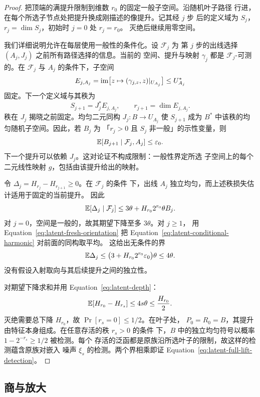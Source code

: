 \begin{proof}
把顶端的满提升限制到维数 $r_0$ 的固定一般子空间。沿随机叶子路径
行进，在每个所选子节点处把提升换成刚描述的像提升。记其经 $j$ 步
后的定义域为 $S_j$，$r_j=\dim S_j$，初始时 $j=0$ 处 $r_j=r_0$。
灭绝后继续用零空间。

我们详细说明允许在每层使用一般性的条件化。设 $\mathcal F_j$ 为
第 $j$ 步的出线选择 $(A_j,J_j)$ 之前所有路径选择的信息。当前的
空间、提升与映射 $\gamma_j$ 都是 $\mathcal F_j$-可测的。在
$\mathcal F_j$ 与 $A_j$ 的条件下，子空间
\[
 E_{j,A_j}
 =\operatorname{im}\bigl[z\mapsto(\gamma_{j,z},z)|_{U_{A_j}}\bigr]
 \le U_{A_j}^*
\]
固定。下一个定义域与其秩为
\[
 S_{j+1}=J_j^*E_{j,A_j},
 \qquad r_{j+1}=\dim E_{j,A_j}.
\]
秩在 $J_j$ 揭晓之前固定。均匀二元同构 $J_j:B\to U_{A_j}$ 使
$S_{j+1}$ 成为 $B^*$ 中该秩的均匀随机子空间。因此，若 $B_j$ 为
「$r_j>0$ 且 $S_j$ 非一般」的示性变量，则
\begin{equation}\label{eq:latent-fresh-orientation}
 \mathbb E[B_{j+1}\mid\mathcal F_j,A_j]\le\varepsilon_0.
\end{equation}
下一个提升可以依赖 $J_j$。这对论证不构成限制：一般性界定所选
子空间上的每个二元线性映射 $g$，包括由该提升给出的映射。

令 $\Delta_j=H_{r_j}-H_{r_{j+1}}\ge0$。在 $\mathcal F_j$ 的条件
下，出线 $A_j$ 独立均匀，而上述秩损失估计适用于固定的当前提升。
因此
\begin{equation}\label{eq:latent-conditional-harmonic}
 \mathbb E[\Delta_j\mid\mathcal F_j]
 \le3\theta+H_{r_0}2^{r_0}\theta B_j.
\end{equation}
对 $j=0$，空间是一般的，故其期望下降至多 $3\theta$。对 $j\ge1$，
用 Equation~\eqref{eq:latent-fresh-orientation} 把
Equation~\eqref{eq:latent-conditional-harmonic} 对前面的同构取平均。
这给出无条件的界
\[
 \mathbb E\Delta_j
 \le\bigl(3+H_{r_0}2^{r_0}\varepsilon_0\bigr)\theta
 \le4\theta.
\]
没有假设入射取向与其后续提升之间的独立性。

对期望下降求和并用 Equation~\eqref{eq:latent-depth}：
\[
 \mathbb E[H_{r_0}-H_{r_s}]\le4s\theta\le\frac{H_{r_0}}2.
\]
灭绝需要总下降 $H_{r_0}$，故 $\Pr[r_s=0]\le1/2$。在叶子处，
$P_0=R_0=B$，其提升由特征本身组成。在任意存活的秩 $r_s>0$ 的条件
下，$B$ 中的独立均匀符号以概率 $1-2^{-r_s}\ge1/2$ 被检测。每个
存活的泛函都是原族沿所选叶子的限制，故这样的检测蕴含原族对嵌入
噪声 $\xi_s$ 的检测。两个界相乘即证
Equation~\eqref{eq:latent-full-lift-detection}。
\end{proof}

\subsection{商与放大}

